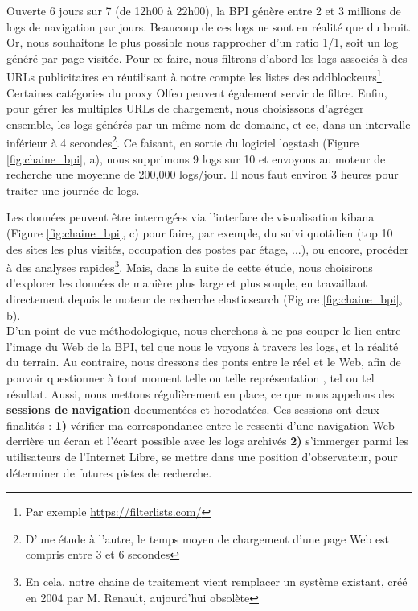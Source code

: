\documentclass[symmetric,justified,marginals=raggedouter]{tufte-book}
\begin{document}
Ouverte 6 jours sur 7 (de 12h00 à 22h00), la BPI génère entre 2 et 3 millions de logs de navigation par jours. Beaucoup de ces logs ne sont en réalité que du bruit. Or, nous souhaitons le plus possible nous rapprocher d'un ratio 1/1, soit un log généré par page visitée. Pour ce faire, nous filtrons d'abord les logs associés à des URLs publicitaires en réutilisant à notre compte les listes des addblockeurs\footnote{Par exemple \url{https://filterlists.com/}}. Certaines catégories du proxy Olfeo peuvent également servir de filtre. Enfin, pour gérer les multiples URLs de chargement, nous choisissons d'agréger ensemble, les logs générés par un même nom de domaine, et ce, dans un intervalle inférieur à 4 secondes\footnote{D'une étude à l'autre, le temps moyen de chargement d'une page Web est compris entre 3 et 6 secondes}. Ce faisant, en sortie du logiciel logstash (Figure \ref{fig:chaine_bpi}, a), nous supprimons 9 logs sur 10 et envoyons au moteur de recherche une moyenne de 200,000 logs/jour. Il nous faut environ 3 heures pour traiter une journée de logs. 

Les données peuvent être interrogées via l'interface de visualisation kibana (Figure \ref{fig:chaine_bpi}, c) pour faire, par exemple, du suivi quotidien (top 10 des sites les plus visités, occupation des postes par étage, ...), ou encore, procéder à des analyses rapides\footnote{En cela, notre chaine de traitement vient remplacer un système existant, créé en 2004 par M. Renault, aujourd'hui obsolète}. Mais, dans la suite de cette étude, nous choisirons d'explorer les données de manière plus large et plus souple, en travaillant directement depuis le moteur de recherche elasticsearch (Figure \ref{fig:chaine_bpi}, b). \\

\noindent D'un point de vue méthodologique, nous cherchons à ne pas couper le lien entre l'image du Web de la BPI, tel que nous le voyons à travers les logs, et la réalité du terrain. Au contraire, nous dressons des ponts entre le réel et le Web, afin de pouvoir questionner à tout moment telle ou telle représentation , tel ou tel résultat. Aussi, nous mettons régulièrement en place, ce que nous appelons des \textbf{sessions de navigation} documentées et horodatées. Ces sessions ont deux finalités : \textbf{1)} vérifier ma correspondance entre le ressenti d'une navigation Web derrière un écran et l'écart possible avec les logs archivés \textbf{2)} s'immerger parmi les utilisateurs de l'Internet Libre, se mettre dans une position d'observateur, pour déterminer de futures pistes de recherche.
\end{document}
